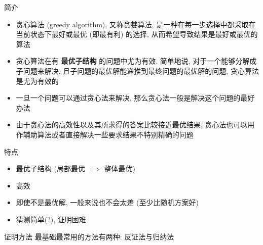 \begin{frame}[fragile]{简介}

	\begin{itemize}
		\item<1-> 贪心算法 (greedy algorithm), 又称贪婪算法, 是一种在每一步选择中都采取在当前状态下最好或最优 (即最有利) 的选择, 从而希望导致结果是最好或最优的算法
		\item<2-> 贪心算法在有 \textbf{最优子结构}\xspace 的问题中尤为有效. 简单地说, 对于一个能够分解成子问题来解决, 且子问题的最优解能递推到最终问题的最优解的问题, 贪心算法是尤为有效的
		\item<3-> 一旦一个问题可以通过贪心法来解决, 那么贪心法一般是解决这个问题的最好办法
		\item<4-> 由于贪心法的高效性以及其所求得的答案比较接近最优结果, 贪心法也可以用作辅助算法或者直接解决一些要求结果不特别精确的问题
	\end{itemize}

\end{frame}

\begin{frame}[fragile]{特点}

	\begin{itemize}
		\item 最优子结构 (局部最优 \(\implies\) 整体最优)
		\item 高效
		\item 即使不是最优解, 一般来说也不会太差 (至少比随机方案好)
		\item 猜测简单(?), 证明困难
	\end{itemize}

\end{frame}

\begin{frame}[fragile]{证明方法}
	最基础最常用的方法有两种: 反证法与归纳法
\end{frame}
